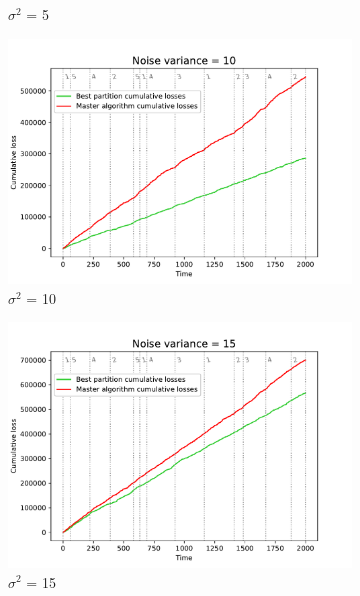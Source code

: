 \documentclass[12pt, twoside]{article}
\begin{document}
\begin{figure}[htb]
\begin{subfigure}{0.33\textwidth}
  \caption{$\sigma^2$ = 5}
  \label{fig:3}
\end{subfigure}

\medskip
\begin{subfigure}{0.33\textwidth}
  \includegraphics[width=\linewidth]{noise_10}
  \caption{$\sigma^2$ = 10}
  \label{fig:4}
\end{subfigure}\hfil %
\begin{subfigure}{0.33\textwidth}
  \includegraphics[width=\linewidth]{noise_15}
  \caption{$\sigma^2$ = 15}
  \label{fig:5}
\end{subfigure}\hfil %
\begin{subfigure}{0.33\textwidth}

\end{subfigure}
\end{figure}
\end{document}
